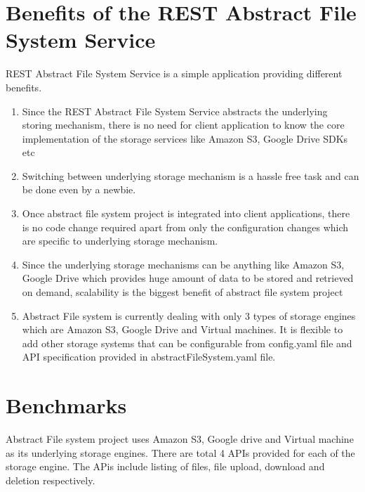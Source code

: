 \section{Benefits of the REST Abstract File System Service}

REST Abstract File System Service is a simple application 
providing different benefits. 

\begin{enumerate}

\item Since the REST Abstract File System Service abstracts the
  underlying storing mechanism, there is no need for client
  application to know the core implementation of the storage services
  like Amazon S3, Google Drive SDKs etc
    
\item Switching between underlying storage mechanism is a hassle free
  task and can be done even by a newbie.
    
\item Once abstract file system project is integrated into client
  applications, there is no code change required apart from only the
  configuration changes which are specific to underlying storage
  mechanism.
    
\item Since the underlying storage mechanisms can be anything like
  Amazon S3, Google Drive which provides huge amount of data to be
  stored and retrieved on demand, scalability is the biggest benefit
  of abstract file system project
	
\item Abstract File system is currently dealing with only 3 types of
  storage engines which are Amazon S3, Google Drive and Virtual
  machines.  It is flexible to add other storage systems that can be
  configurable from config.yaml file and API specification provided in
  abstractFileSystem.yaml file.
    
\end{enumerate}


\section{Benchmarks}

Abstract File system project uses Amazon S3, Google drive and Virtual
machine as its underlying storage engines. There are total 4 APIs
provided for each of the storage engine. The APis include listing of
files, file upload, download and deletion respectively.

